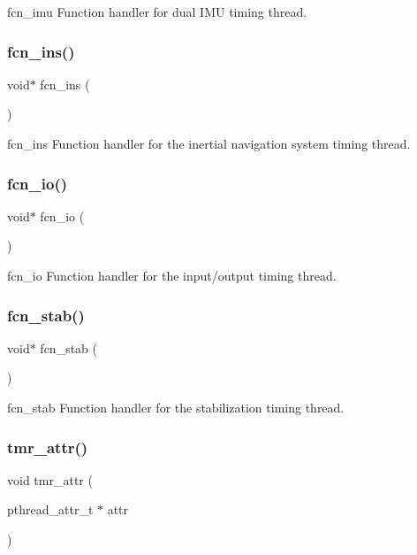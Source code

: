 fcn\+\_\+imu Function handler for dual I\+MU timing thread. \mbox{\label{timer_8c_a7dc60ec0ade92e0cd0bee93a789c6e1f}} 
\subsubsection{fcn\+\_\+ins()}
{\footnotesize\ttfamily void$\ast$ fcn\+\_\+ins (\begin{DoxyParamCaption}{ }\end{DoxyParamCaption})}

fcn\+\_\+ins Function handler for the inertial navigation system timing thread. \mbox{\label{timer_8c_a0b0c61d6fe0afdf49ff0e515f4736aab}} 
\subsubsection{fcn\+\_\+io()}
{\footnotesize\ttfamily void$\ast$ fcn\+\_\+io (\begin{DoxyParamCaption}{ }\end{DoxyParamCaption})}

fcn\+\_\+io Function handler for the input/output timing thread. \mbox{\label{timer_8c_a59c745a47943a10f5b2791c78be1d21d}} 
\subsubsection{fcn\+\_\+stab()}
{\footnotesize\ttfamily void$\ast$ fcn\+\_\+stab (\begin{DoxyParamCaption}{ }\end{DoxyParamCaption})}

fcn\+\_\+stab Function handler for the stabilization timing thread. \mbox{\label{timer_8c_ad71b9abed898e4e2569b85b760aa6f19}} 
\subsubsection{tmr\+\_\+attr()}
{\footnotesize\ttfamily void tmr\+\_\+attr (\begin{DoxyParamCaption}\item[{pthread\+\_\+attr\+\_\+t $\ast$}]{attr }\end{DoxyParamCaption})}

